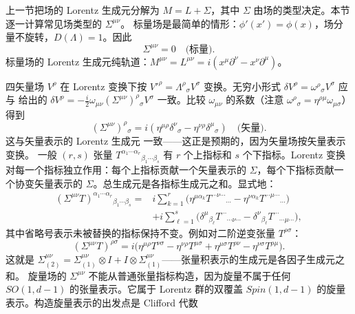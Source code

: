 上一节把场的 Lorentz 生成元分解为 $M=L+\Sigma$，其中 $\Sigma$ 由场的类型决定。本节逐一计算常见场类型的 $\Sigma^{\mu\nu}$。
标量场是最简单的情形：$\phi'(x')=\phi(x)$，场分量不旋转，$D(\Lambda)=1$。因此
\begin{equation*}
{\Sigma^{\mu\nu}=0\quad\text{(标量)}.}
\end{equation*}
标量场的 Lorentz 生成元纯轨道：$M^{\mu\nu}=L^{\mu\nu}=i(x^\mu\partial^\nu-x^\nu\partial^\mu)$。

四矢量场 $V^\rho$ 在 Lorentz 变换下按 $V'^\rho=\Lambda^\rho{}_\sigma V^\sigma$ 变换。无穷小形式 $\delta V^\rho=\omega^\rho{}_\sigma V^\sigma$ 应与 给出的 $\delta V^\rho=-\frac{i}{2}\omega_{\mu\nu}(\Sigma^{\mu\nu})^\rho{}_\sigma V^\sigma$ 一致。比较 $\omega_{\mu\nu}$ 的系数（注意 $\omega^\rho{}_\sigma=\eta^{\rho\mu}\omega_{\mu\sigma}$）得到
\begin{equation*}{
(\Sigma^{\mu\nu})^\rho{}_\sigma=i(\eta^{\mu\rho}\delta^\nu{}_\sigma-\eta^{\nu\rho}\delta^\mu{}_\sigma)\quad\text{(矢量)}.
}
\end{equation*}
这与矢量表示的 Lorentz 生成元 一致——这正是预期的，因为矢量场按矢量表示变换。
一般 $(r,s)$ 张量 $T^{\alpha_1\cdots\alpha_r}{}_{\beta_1\cdots\beta_s}$ 有 $r$ 个上指标和 $s$ 个下指标。Lorentz 变换对每一个指标独立作用：每个上指标贡献一个矢量表示的 $\Sigma$，每个下指标贡献一个协变矢量表示的 $\Sigma$。总生成元是各指标生成元之和。显式地：
\begin{equation*}{
\begin{aligned}
(\Sigma^{\mu\nu}T)^{\alpha_1\cdots\alpha_r}{}_{\beta_1\cdots\beta_s}
={}&i\sum_{k=1}^{r}\Big(\eta^{\mu\alpha_k}T^{\cdots\nu\cdots}{}_{\cdots}-\eta^{\nu\alpha_k}T^{\cdots\mu\cdots}{}_{\cdots}\Big)\\
&+i\sum_{\ell=1}^{s}\Big(\delta^\mu{}_{\beta_\ell}T^{\cdots}{}_{\cdots\nu\cdots}-\delta^\nu{}_{\beta_\ell}T^{\cdots}{}_{\cdots\mu\cdots}\Big),
\end{aligned}
}
\end{equation*}
其中省略号表示未被替换的指标保持不变。例如对二阶逆变张量 $T^{\rho\sigma}$：
\begin{equation*}
(\Sigma^{\mu\nu}T)^{\rho\sigma}=i\big(\eta^{\mu\rho}T^{\nu\sigma}-\eta^{\nu\rho}T^{\mu\sigma}+\eta^{\mu\sigma}T^{\rho\nu}-\eta^{\nu\sigma}T^{\rho\mu}\big).
\end{equation*}
这就是 $\Sigma^{\mu\nu}_{(2)}=\Sigma^{\mu\nu}_{(1)}\otimes I+I\otimes\Sigma^{\mu\nu}_{(1)}$——张量积表示的生成元是各因子生成元之和。
旋量场的 $\Sigma^{\mu\nu}$ 不能从普通张量指标构造，因为旋量不属于任何 $SO(1,d-1)$ 的张量表示。它属于 Lorentz 群的双覆盖 $Spin(1,d-1)$ 的旋量表示。构造旋量表示的出发点是 Clifford 代数
